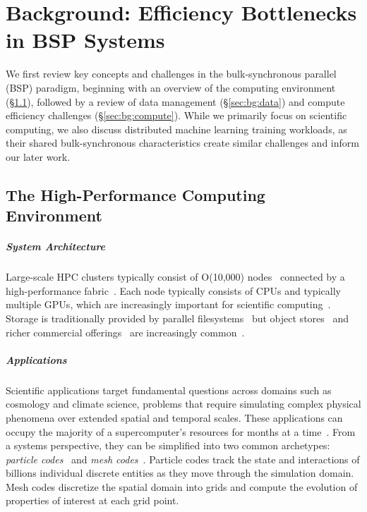 \chapter{Background: Efficiency Bottlenecks in BSP Systems}
\label{chap:bg}


We first review key concepts and challenges in the bulk-synchronous parallel (BSP) paradigm,
beginning with an overview of the computing environment (\S\ref{sec:bg:hpc}), followed by a review
of data management (\S\ref{sec:bg:data}) and compute efficiency challenges (\S\ref{sec:bg:compute}).
While we primarily focus on scientific computing, we also discuss distributed machine learning
training workloads, as their shared bulk-synchronous characteristics create similar challenges and
inform our later work.

\section{The High-Performance Computing Environment}
\label{sec:bg:hpc}

\paragraph{System Architecture}
Large-scale HPC clusters typically consist of O(10,000) nodes~\cite{:TOP500ListJune} connected by a
high-performance fabric~\cite{Pfist2001:Infiniband,Rowet2022:Slingshot,Metz2024:UltraEthernet}.
Each node typically consists of CPUs and typically multiple GPUs, which are increasingly important
for scientific computing~\cite{DeBar2014:HPCGPU,Snell2017:HPCGPU}.
Storage is traditionally provided by parallel filesystems~\cite{Braam2002:Lustre} but object
stores~\cite{Henne2020:DAOS} and richer commercial offerings~\cite{2024:Hammerspace,:VASTPlatform}
are increasingly common~\cite{Glenn2025:NoPFS}.

\paragraph{Applications}
Scientific applications target fundamental questions across domains such as cosmology and climate
science, problems that require simulating complex physical phenomena over extended spatial and
temporal scales.
These applications can occupy the majority of a supercomputer's resources for months at a
time~\cite{Das2023:LargeScale, Stock2024:LargeScale,Gary2023:LANLPlatformPlanning}.
From a systems perspective, they can be simplified into two common archetypes: \emph{particle
  codes}~\cite{Bird2022:VPIC2.0} and \emph{mesh codes}~\cite{Dubey2014:Survey}.
Particle codes track the state and interactions of billions individual discrete entities as they
move through the simulation domain.
Mesh codes discretize the spatial domain into grids and compute the evolution of properties of
interest at each grid point.

